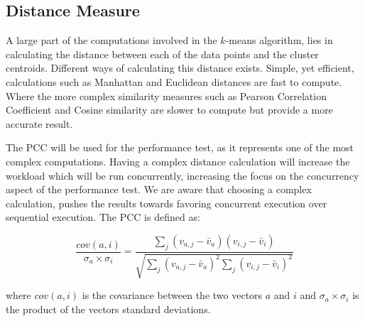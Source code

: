 \subsection{Distance Measure}
A large part of the computations involved in the $k$-means algorithm, lies in calculating the distance between each of the data points and the cluster centroids. Different ways of calculating this distance exists. Simple, yet efficient, calculations such as Manhattan and Euclidean\cite[p. 41]{amatriain2011data} distances are fast to compute. Where the more complex similarity measures such as Pearson Correlation Coefficient and Cosine similarity\cite[p. 42]{amatriain2011data}\cite{breese1998empirical} are slower to compute but provide a more accurate result.

The \ac{PCC} will be used for the performance test, as it represents one of the most complex computations. Having a complex distance calculation will increase the workload which will be run concurrently, increasing the focus on the concurrency aspect of the performance test. We are aware that choosing a complex calculation, pushes the results towards favoring concurrent execution over sequential execution. The \ac{PCC} is defined as:

\begin{equation}\label{pearsonverbose}
\frac{cov(a,i)}{\sigma_a \times \sigma_i} = \frac{\sum_j(v_{a,j}-\bar{v}_a)(v_{i,j}-\bar{v}_i)}{\sqrt{{\sum_j}(v_{a,j}-\bar{v}_a)^2 \sum_j(v_{i,j}-\bar{v}_i)^2}}
\end{equation}

where $cov(a,i)$ is the covariance between the two vectors $a$ and $i$ and $\sigma_a \times \sigma_i$ is the product of the vectors standard deviations.
\worksheetend